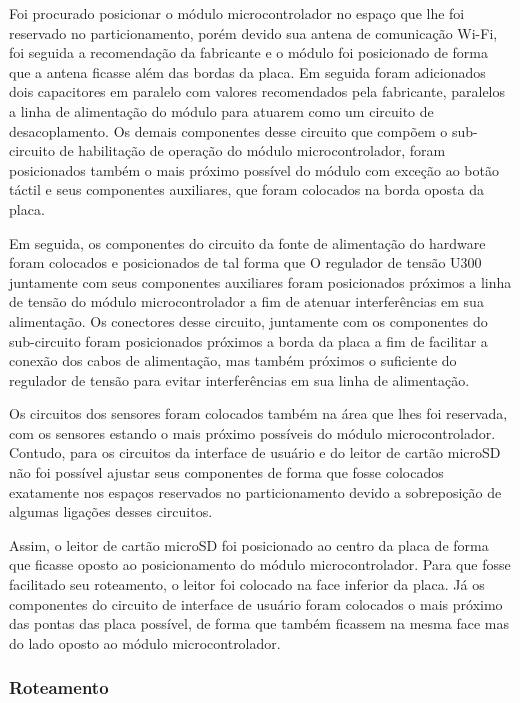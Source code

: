 Foi procurado posicionar o módulo microcontrolador no espaço que lhe foi reservado no particionamento, porém devido sua antena de comunicação Wi-Fi, foi seguida a recomendação da fabricante e o módulo foi posicionado de forma que a antena ficasse além das bordas da placa. Em seguida foram adicionados dois capacitores em paralelo com valores recomendados pela fabricante, paralelos a linha de alimentação do módulo para atuarem como um circuito de desacoplamento. Os demais componentes desse circuito que compõem o sub-circuito de habilitação de operação do módulo microcontrolador, foram posicionados também o mais próximo possível do módulo com exceção ao botão táctil e seus componentes auxiliares, que foram colocados na borda oposta da placa.

Em seguida, os componentes do circuito da fonte de alimentação do hardware foram colocados e posicionados de tal forma que O regulador de tensão U300 juntamente com seus componentes auxiliares foram posicionados próximos a linha de tensão do módulo microcontrolador a fim de atenuar interferências em sua alimentação. Os conectores desse circuito, juntamente com os componentes do sub-circuito foram posicionados próximos a borda da placa a fim de facilitar a conexão dos cabos de alimentação, mas também próximos o suficiente do regulador de tensão para evitar interferências em sua linha de alimentação. 

Os circuitos dos sensores foram colocados também na área que lhes foi reservada, com os sensores estando o mais próximo possíveis do módulo microcontrolador. Contudo, para os circuitos da interface de usuário e do leitor de cartão microSD não foi possível ajustar seus componentes de forma que fosse colocados exatamente nos espaços reservados no particionamento devido a sobreposição de algumas ligações desses circuitos.

Assim, o leitor de cartão microSD foi posicionado ao centro da placa de forma que ficasse oposto ao posicionamento do módulo microcontrolador. Para que fosse facilitado seu roteamento, o leitor foi colocado na face inferior da placa. Já os componentes do circuito de interface de usuário foram colocados o mais próximo das pontas das placa possível, de forma que também ficassem na mesma face mas do lado oposto ao módulo microcontrolador.


\subsubsection{Roteamento}


